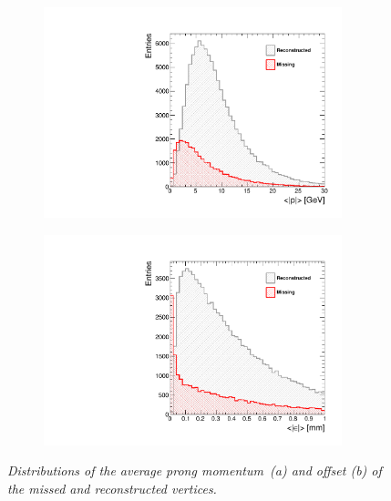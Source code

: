 \begin{figure}
	\centering
	\begin{subfigure}{0.5\textwidth}
		\includegraphics[width=0.95\textwidth]{ILD/plots/rec-missed-p-vtx.pdf}
		\caption{\label{fig:RecMissedParams_a_3} }
	\end{subfigure}%
	\begin{subfigure}{0.5\textwidth}
		\centering
		\includegraphics[width=0.95\textwidth]{ILD/plots/rec-missed-s-vtx.pdf}
		\caption{\label{fig:RecMissedParams_b_3} }
	\end{subfigure}
	\caption{\sl Distributions of the average prong momentum~(a) and offset (b) of the missed and reconstructed vertices. }
	\label{fig:RecMissedParams_3}
\end{figure}

